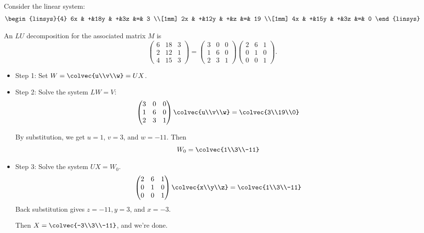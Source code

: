 \begin{example}
Consider the linear system:
\[
      \begin{linsys}{4}
            6x & +&18y & +&3z         &=& 3  \\[1mm]
            2x & +&12y & +&z	    &=& 19 \\[1mm]
            4x & +&15y & +&3z         &=& 0  
      \end{linsys}
\]

An $LU$ decomposition for the associated matrix $M$ is
\[
\begin{pmatrix}
6 & 18 & 3 \\
2 & 12 & 1 \\
4 & 15 & 3 
\end{pmatrix} =
\begin{pmatrix}
3 & 0 & 0 \\
1 & 6 & 0 \\
2 & 3 & 1 
\end{pmatrix}
\begin{pmatrix}
2 & 6 & 1 \\
0 & 1 & 0 \\
0 & 0 & 1 
\end{pmatrix}.
\]

\begin{itemize}
\item{Step 1:} \hypertarget{LUproc}{Set} $W=\colvec{u\\v\\w}=UX$.  

\item{Step 2:} Solve the system $LW=V$:
\[
\begin{pmatrix}
3 & 0 & 0 \\
1 & 6 & 0 \\
2 & 3 & 1 
\end{pmatrix}
\colvec{u\\v\\w} =
\colvec{3\\19\\0}
\]

By substitution, we get $u=1$, $v=3$, and $w=-11$.  Then 
\[W_0=\colvec{1\\3\\-11}\]

\item{Step 3:} Solve the system $UX=W_0$.  
\[
\begin{pmatrix}
2 & 6 & 1 \\
0 & 1 & 0 \\
0 & 0 & 1 
\end{pmatrix}
\colvec{x\\y\\z} =
\colvec{1\\3\\-11}
\]
Back substitution gives $z=-11, y=3$, and $x=-3$.  

Then $X=\colvec{-3\\3\\-11}$, and we're done.
\end{itemize}
\end{example}

